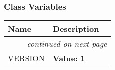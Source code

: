   \subsubsection{Class Variables}

    \vspace{-1cm}
\hspace{\varindent}\begin{longtable}{|p{\varnamewidth}|p{\vardescrwidth}|l}
\cline{1-2}
\cline{1-2} \centering \textbf{Name} & \centering \textbf{Description}& \\
\cline{1-2}
\endhead\cline{1-2}\multicolumn{3}{r}{\small\textit{continued on next page}}\\\endfoot\cline{1-2}
\endlastfoot\raggedright V\-E\-R\-S\-I\-O\-N\- & \raggedright \textbf{Value:} 
{\tt 1}&\\
\cline{1-2}
\end{longtable}

